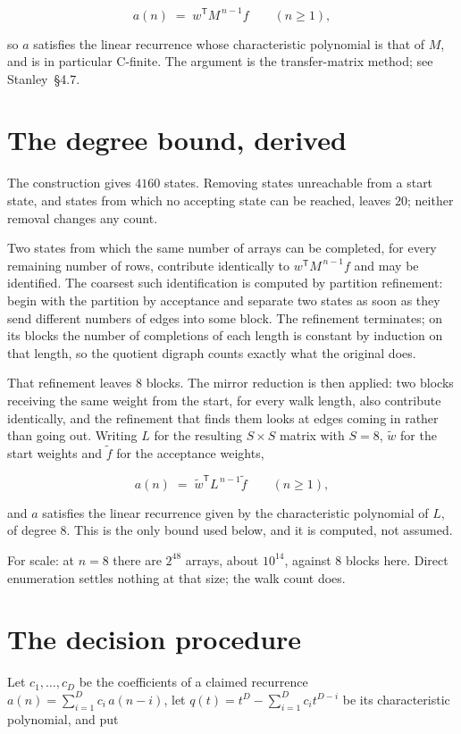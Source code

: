 \documentclass[11pt]{article}
\theoremstyle{definition}
\begin{document}
\[a(n) \;=\; w^{\mathsf T} M^{\,n-1} f \qquad (n \ge 1),\]

so $a$ satisfies the linear recurrence whose characteristic polynomial is that of $M$, and is in particular C-finite. The argument is the transfer-matrix method; see Stanley~\S4.7.

\section{The degree bound, derived}

The construction gives $4160$ states. Removing states unreachable from a start state, and states from which no accepting state can be reached, leaves $20$; neither removal changes any count.

Two states from which the same number of arrays can be completed, for every remaining number of rows, contribute identically to $w^{\mathsf T}M^{\,n-1}f$ and may be identified. The coarsest such identification is computed by partition refinement: begin with the partition by acceptance and separate two states as soon as they send different numbers of edges into some block. The refinement terminates; on its blocks the number of completions of each length is constant by induction on that length, so the quotient digraph counts exactly what the original does.

That refinement leaves $8$ blocks. The mirror reduction is then applied: two blocks receiving the same weight from the start, for every walk length, also contribute identically, and the refinement that finds them looks at edges coming in rather than going out. Writing $L$ for the resulting $S \times S$ matrix with $S = 8$, $\tilde w$ for the start weights and $\tilde f$ for the acceptance weights,

\[a(n) \;=\; \tilde w^{\mathsf T} L^{\,n-1} \tilde f \qquad (n \ge 1),\]

and $a$ satisfies the linear recurrence given by the characteristic polynomial of $L$, of degree $8$. This is the only bound used below, and it is computed, not assumed.

For scale: at $n = 8$ there are $2^{48}$ arrays, about $10^{14}$, against $8$ blocks here. Direct enumeration settles nothing at that size; the walk count does.

\section{The decision procedure}

Let $c_1,\dots,c_D$ be the coefficients of a claimed recurrence $a(n) = \sum_{i=1}^{D} c_i\,a(n-i)$, let $q(t) = t^{D} - \sum_{i=1}^{D} c_i t^{D-i}$ be its characteristic polynomial, and put
\end{document}
